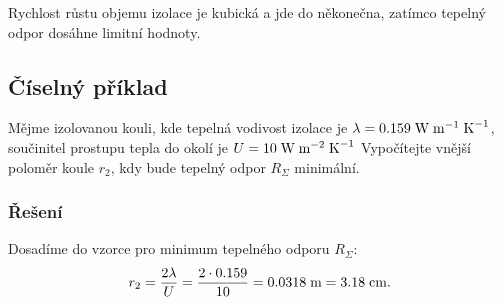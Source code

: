 \documentclass{article}
\begin{document}
Rychlost růstu objemu izolace je kubická a jde do někonečna, zatímco tepelný odpor dosáhne limitní hodnoty.


\subsection{Číselný příklad}
Mějme izolovanou kouli, kde tepelná vodivost izolace je $\lambda = 0.159 \; \textrm{W} \; \textrm{m}^{-1} \; \textrm{K}^{-1}$, součinitel prostupu tepla do okolí je $U = 10 \; \textrm{W} \; \textrm{m}^{-2} \; \textrm{K}^{-1}$ Vypočítejte vnější poloměr koule $r_2$, kdy bude tepelný odpor $R_\Sigma$ minimální.

\subsubsection{Řešení}
Dosadíme do vzorce pro minimum tepelného odporu $R_\Sigma$:
$$
    r_2 = \frac{2 \lambda}{U} = \frac{2 \cdot 0.159}{10} = 0.0318 \; \textrm{m} = 3.18 \; \textrm{cm}.
$$
\end{document}
